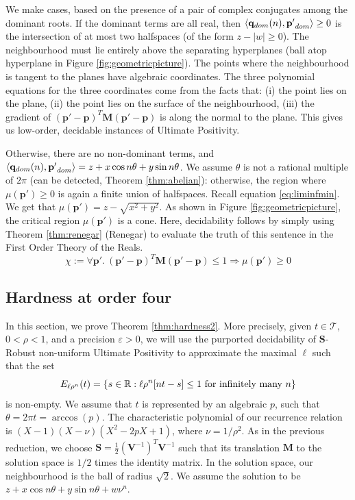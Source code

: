 We make cases, based on the presence of a pair of complex conjugates among the dominant roots. If the dominant terms are all real, then $\langle\mathbf{q}_{dom}(n), \mathbf{p'}_{dom}\rangle \ge 0$ is the intersection of at most two halfspaces (of the form $z - |w| \ge 0$). The neighbourhood must lie entirely above the separating hyperplanes (ball atop hyperplane in Figure \ref{fig:geometricpicture}). The points where the neighbourhood is tangent to the planes have algebraic coordinates. The three polynomial equations for the three coordinates come from the facts that: (i) the point lies on the plane, (ii) the point lies on the surface of the neighbourhood, (iii) the gradient of $(\mathbf{p'} - \mathbf{p})^T\mathbf{M}(\mathbf{p'} - \mathbf{p})$ is along the normal to the plane. This gives us low-order, decidable instances of Ultimate Positivity.

Otherwise, there are no non-dominant terms, and $\langle\mathbf{q}_{dom}(n), \mathbf{p'}_{dom}\rangle = z + x\cos n\theta + y\sin n\theta$. We assume $\theta$ is not a rational multiple of $2\pi$ (can be detected, Theorem \ref{thm:abelian}): otherwise, the region where $\mu(\mathbf{p'}) \ge 0$ is again a finite union of halfspaces. Recall equation \ref{eq:liminfmin}. We get that $\mu(\mathbf{p'}) = z -\sqrt{x^2 + y^2}$. As shown in Figure \ref{fig:geometricpicture}, the critical region $\mu(\mathbf{p'})$ is a cone. Here, decidability follows by simply using Theorem \ref{thm:renegar} (Renegar) to evaluate the truth of this sentence in the First Order Theory of the Reals.
\begin{equation}
\label{eq:firsttask}
\chi := \forall \mathbf{p'}.~ (\mathbf{p'} - \mathbf{p})^T\mathbf{M}(\mathbf{p'} - \mathbf{p}) \le 1 \Rightarrow \mu(\mathbf{p'}) \ge 0
\end{equation}

\subsection{Hardness at order four}
\label{section:hardness2}
In this section, we prove Theorem \ref{thm:hardness2}. More precisely, given $t \in \mathcal{T}$, $0 < \rho < 1$, and a precision $\varepsilon > 0$, we will use the purported decidability of $\mathbf{S}$-Robust non-uniform Ultimate Positivity to approximate the maximal $\ell$ such that the set 
$$
E_{\ell\rho^n}(t) = \{s\in \mathbb{R}: \ell\rho^n[nt - s] \le 1 \text{ for infinitely many } n\}
$$
is non-empty. We assume that $t$ is represented by an algebraic $p$, such that $\theta = 2\pi t = \arccos(p)$. The characteristic polynomial of our recurrence relation is $(X-1)(X-\nu)(X^2 - 2pX + 1)$, where $\nu = 1/\rho^2$. As in the previous reduction, we choose $\mathbf{S} = \frac{1}{2}(\mathbf{V}^{-1})^T\mathbf{V}^{-1}$ such that its translation $\mathbf{M}$ to the solution space is $1/2$ times the identity matrix. In the solution space, our neighbourhood is the ball of radius $\sqrt{2}$. We assume the solution to be $z + x\cos n\theta + y\sin n\theta + w\nu^n$.

